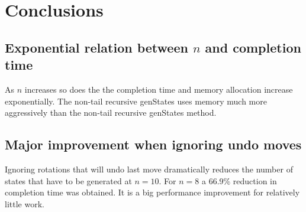 \documentclass[]{article}
\begin{document}
\section{Conclusions}
\subsection{Exponential relation between \(n\) and completion time}
As \(n\) increases so does the the completion time and memory allocation increase exponentially. The non-tail recursive genStates uses memory much more aggressively than the non-tail recursive genStates method.
\subsection{Major improvement when ignoring undo moves}
Ignoring rotations that will undo last move dramatically reduces the number of states that have to be generated at \(n = 10\). For \(n = 8\) a 66.9\% reduction in completion time was obtained. It is a big performance improvement for relatively little work.
\end{document}
